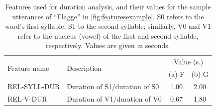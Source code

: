 \begin{table}%
		\centering
		\caption[Features used for duration analysis]{Features used for duration analysis, and their values for the sample utterances of ``Flagge'' in \cref{fig:featuresexample}. 
		S0 refers to the word's first syllable, S1 to the second syllable; similarly, V0 and V1 refer to the nucleus (vowel) of the first and second syllable, respectively.
		Values are given in seconds. 
		}
		
%
%		
		\begin{tabularx}{\textwidth}{lXcc}
		\toprule
		\multirow{2}{*}{Feature name} 
									& \multirow{2}{*}{Description}
														& \multicolumn{2}{c}{Value (s.)} \\
	&												&  (a) F		& (b) G \\
		\midrule
		REL-SYLL-DUR 	
			& Duration of S1$/$duration of S0
			& 1.00			& 2.00			\\
		REL-V-DUR 		
			& Duration of V1$/$duration of V0
			& 0.67			& 1.80 			\\
		\bottomrule	
		\end{tabularx}
		\label{tab:durationfeatures}
\end{table}



